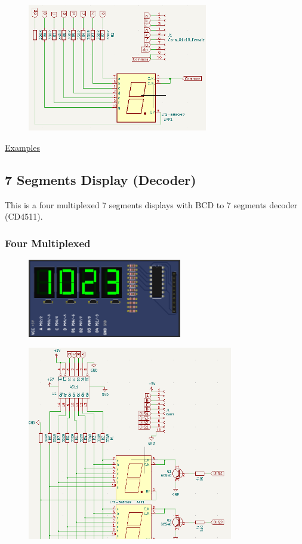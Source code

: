 \begin{figure}[H]
\center
\includegraphics[width=0.7\textwidth]{img/part_7seg1_.png} 
\end{figure} 


\href{https://lcgamboa.github.io/picsimlab_examples/parts_7_Segments_Display.html}{Examples}

\subsection{7 Segments Display (Decoder)}

This is a four multiplexed 7 segments displays with BCD to 7 segments decoder (CD4511).


\subsubsection{Four Multiplexed}
\begin{figure}[H]
\center
\includegraphics[width=0.6\textwidth]{img/part_7seg_dec.png} 
\end{figure} 

\begin{figure}[H]
\center
\includegraphics[width=0.8\textwidth]{img/part_7seg_dec_.png} 
\end{figure} 

